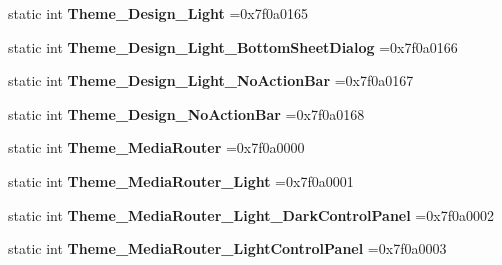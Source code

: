 \begin{DoxyCompactItemize}
static int {\bfseries Theme\+\_\+\+Design\+\_\+\+Light} =0x7f0a0165
\item 
\mbox{\label{classandroid_1_1support_1_1graphics_1_1drawable_1_1R_1_1style_a6adcfab23f9bd3ab93d40f7deda6fb91}} 
static int {\bfseries Theme\+\_\+\+Design\+\_\+\+Light\+\_\+\+Bottom\+Sheet\+Dialog} =0x7f0a0166
\item 
\mbox{\label{classandroid_1_1support_1_1graphics_1_1drawable_1_1R_1_1style_ab0d08621889f39e01aaf337b2af65712}} 
static int {\bfseries Theme\+\_\+\+Design\+\_\+\+Light\+\_\+\+No\+Action\+Bar} =0x7f0a0167
\item 
\mbox{\label{classandroid_1_1support_1_1graphics_1_1drawable_1_1R_1_1style_aaf2cf7eddfec4ba413dc6120248a9453}} 
static int {\bfseries Theme\+\_\+\+Design\+\_\+\+No\+Action\+Bar} =0x7f0a0168
\item 
\mbox{\label{classandroid_1_1support_1_1graphics_1_1drawable_1_1R_1_1style_a0117d52157c5dd87fc92b9bb0610108c}} 
static int {\bfseries Theme\+\_\+\+Media\+Router} =0x7f0a0000
\item 
\mbox{\label{classandroid_1_1support_1_1graphics_1_1drawable_1_1R_1_1style_a4830d9cc26dddbea656eea5a48be5058}} 
static int {\bfseries Theme\+\_\+\+Media\+Router\+\_\+\+Light} =0x7f0a0001
\item 
\mbox{\label{classandroid_1_1support_1_1graphics_1_1drawable_1_1R_1_1style_a689f9365aab64a8c48323fee19e90afa}} 
static int {\bfseries Theme\+\_\+\+Media\+Router\+\_\+\+Light\+\_\+\+Dark\+Control\+Panel} =0x7f0a0002
\item 
\mbox{\label{classandroid_1_1support_1_1graphics_1_1drawable_1_1R_1_1style_a928fbd7fb67ee959b9e52bbdd55e05de}} 
static int {\bfseries Theme\+\_\+\+Media\+Router\+\_\+\+Light\+Control\+Panel} =0x7f0a0003
\item 
\mbox{\label{classandroid_1_1support_1_1graphics_1_1drawable_1_1R_1_1style_a2e915087c3feac8f2635f81485edb127}} 

\end{DoxyCompactItemize}
